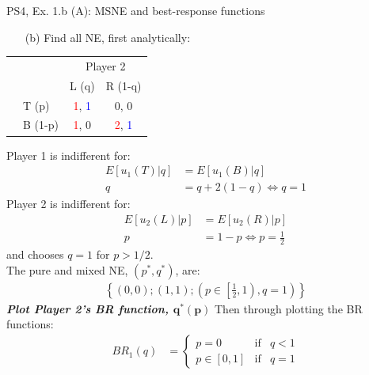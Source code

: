 \begin{frame}{PS4, Ex. 1.b (A): MSNE and best-response functions}
  \begin{multicols}{2}
    \begin{itemize}
      \item[(b)] Find all NE, first analytically:
    \end{itemize}
    \begin{table}
      \begin{tabular}{cl|c|c|}
        & \multicolumn{1}{c}{} & \multicolumn{2}{c}{\color{blue}Player 2}\\
        \parbox[t]{1mm}{}
        &  &  &  \\
        & T (p) & \textcolor{red}{1}, \textcolor{blue}{1} & 0, 0 \\
        & B (1-p) & \textcolor{red}{1}, 0 & \textcolor{red}{2}, \textcolor{blue}{1} \\
      \end{tabular}
    \end{table}
    Player 1 is indifferent for:
    \begin{align*}
      E[u_1(T)|q]&=E[u_1(B)|q]\\
      q &= q + 2(1-q) \Leftrightarrow q = 1
    \end{align*}
    Player 2 is indifferent for:
    \begin{align*}
      E[u_2(L)|p]&=E[u_2(R)|p]\\
      p &= 1-p \Leftrightarrow p = \frac{1}{2}
    \end{align*}
    and chooses $q=1$ for $p>1/2$.\\\medskip
    The pure and mixed NE, $(p^{*},q^{*})$, are:
    \begin{align*}
      \left\{(0,0);(1,1);\left(p\in\left[\frac{1}{2},1\right),q=1\right)\right\}
    \end{align*}
    \textbf{\textit{Plot Player 2's BR function, $\bm{q^{*}(p)}$}}
  \vfill\null \columnbreak
    Then through plotting the BR functions:
    \vspace{-8pt}
    \begin{align*}
      BR_1(q)&=\left\{ \begin{array}{lcl}
          p=0       & \text{if} & q<1 \\
          p\in[0,1] & \text{if} & q=1
      \end{array}\right. \\

\end{align*}
\end{multicols}
\end{frame}
